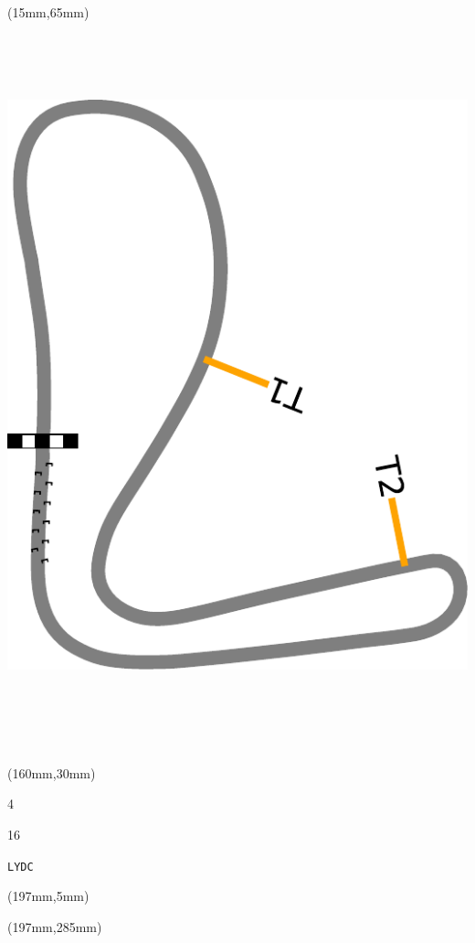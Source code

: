 \begin{textblock*}{185mm}(15mm,65mm)%
\centering
\mbox{\includegraphics[width=185mm,height=210mm,keepaspectratio]{PT/LYDC.pdf}}
\end{textblock*}
\begin{textblock*}{40mm}(160mm,30mm)%
\Large
\par{} 
\par4 
\par16 
\par\hfill\tiny\tt LYDC\\
\end{textblock*}
\begin{textblock*}{20mm}(197mm,5mm)%
\fbox{\thepage}
\label{LYDC}
\end{textblock*}
\begin{textblock*}{20mm}(197mm,285mm)%
\fbox{\thepage}
\end{textblock*}

